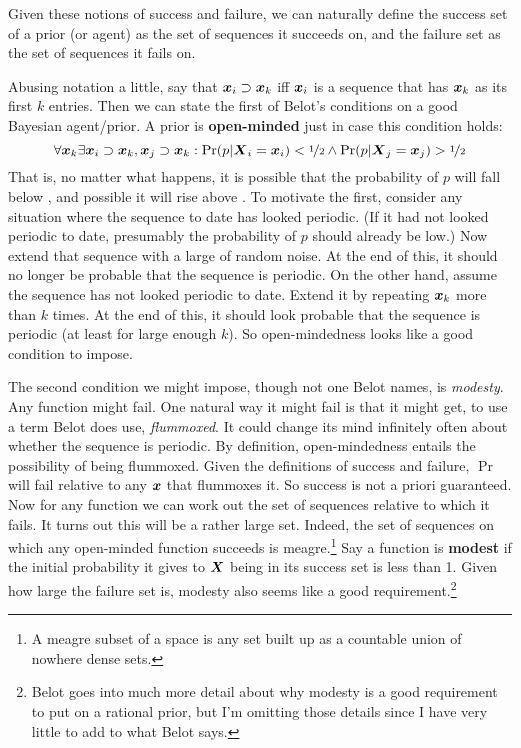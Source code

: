 Given these notions of success and failure, we can naturally define the success set of a prior (or agent) as the set of sequences it succeeds on, and the failure set as the set of sequences it fails on.

Abusing notation a little, say that $\boldsymbol{x}_i \supset \boldsymbol{x}_k$ iff $\boldsymbol{x}_i$ is a sequence that has $\boldsymbol{x}_k$ as its first $k$ entries. Then we can state the first of Belot's conditions on a good Bayesian agent/prior. A prior  is \textbf{open-minded} just in case this condition holds:
\[
\forall \boldsymbol{x}_k \exists \boldsymbol{x}_i \supset \boldsymbol{x}_k, \boldsymbol{x}_j \supset \boldsymbol{x}_k: \Pr(p | \boldsymbol{X}_i = \boldsymbol{x}_i) < \nicefrac{1}{2} \wedge \Pr(p | \boldsymbol{X}_j = \boldsymbol{x}_j) > \nicefrac{1}{2}
\]
That is, no matter what happens, it is possible that the probability of $p$ will fall below , and possible it will rise above . To motivate the first, consider any situation where the sequence to date has looked periodic. (If it had not looked periodic to date, presumably the probability of $p$ should already be low.) Now extend that sequence with a large of random noise. At the end of this, it should no longer be probable that the sequence is periodic. On the other hand, assume the sequence has not looked periodic to date. Extend it by repeating $\boldsymbol{x}_k$ more than $k$ times. At the end of this, it should look probable that the sequence is periodic (at least for large enough $k$). So open-minded\-ness looks like a good condition to impose.

The second condition we might impose, though not one Belot names, is \textit{modesty}. Any function might fail. One natural way it might fail is that it might get, to use a term Belot does use, \textit{flummoxed}. It could change its mind infinitely often about whether the sequence is periodic. By definition, open-mindedness entails the possibility of being flummoxed. Given the definitions of success and failure, $\Pr$ will fail relative to any $\boldsymbol{x}$ that flummoxes it. So success is not a priori guaranteed. Now for any function we can work out the set of sequences relative to which it fails. It turns out this will be a rather large set. Indeed, the set of sequences on which any open-minded function succeeds is meagre.\footnote{A meagre subset of a space is any set built up as a countable union of nowhere dense sets.} Say a function is \textbf{modest} if the initial probability it gives to $\boldsymbol{X}$ being in its success set is less than 1. Given how large the failure set is, modesty also seems like a good requirement.\footnote{Belot goes into much more detail about why modesty is a good requirement to put on a rational prior, but I'm omitting those details since I have very little to add to what Belot says.}

